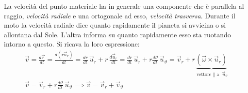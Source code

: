 \documentclass[10pt,a4paper]{book}
\begin{document}
La velocità del punto materiale ha in generale una componente che è parallela al raggio, \emph{velocità radiale} e una ortogonale ad esso, \emph{velocità trasversa}. Durante il moto la velocità radiale dice quanto rapidamente il pianeta si avvicina o si allontana dal Sole. L'altra informa su quanto rapidamente esso sta ruotando intorno a questo.
Si ricava la loro espressione:
\begin{gather*}
	\vec{v}=\frac{d\vec{r}}{dt}=\frac{d(r\vec{u}_r)}{dt}=\frac{dr}{dt}\,\vec{u}_r+r\,\frac{d\vec{u}_r}{dt}=\frac{dr}{dt}\,\vec{u}_r+r\frac{d\vartheta}{dt}\,\vec{u}_\vartheta=\vec{v}_r+r\underbrace{(\vec{\omega}\times\vec{u}_r)}_{\text{vettore $\parallel$ a } \vec{u}_\vartheta} \\
	\vec{v}=\vec{v}_r+r\frac{d\vartheta}{dt}\, \vec{u}_\vartheta \implies \vec{v}=\vec{v}_r+\vec{v}_\vartheta
\end{gather*}
\end{document}
